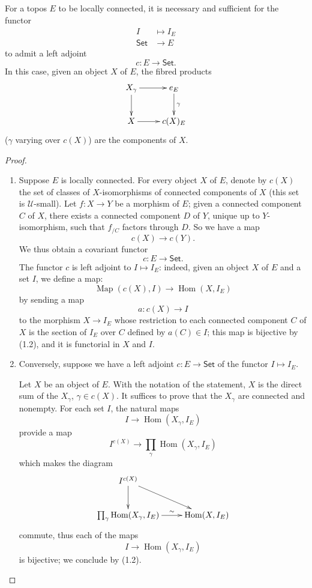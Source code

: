 \documentclass[10pt,oneside]{amsart}
\newcommand{\oldpage}[1]{\marginnote{\textbf{#1}}}
\newcommand{\cal}{\mathcal}
\newcommand{\cat}{\mathsf}
\DeclareMathOperator{\Hom}{Hom}
\DeclareMathOperator{\Map}{Map}
\begin{document}
\subsection{}
For a topos $E$ to be locally connected, it is necessary and sufficient for the functor
\begin{align*}
  I & \longmapsto I_E\\
  \cat{Set} & \longrightarrow E
\end{align*}
to admit a left adjoint
\[
  c:E\longrightarrow\cat{Set}.
\]
In this case, given an object $X$ of $E$, the fibred products
\[
  \xymatrix{
    X_\gamma\ar[r]\ar[d] & e_E\ar[d]^\gamma\\
    X\ar[r] & c(X)_E
  }
\]
($\gamma$ varying over $c(X)$) are the components of $X$.

\begin{proof}
\medskip\noindent
\begin{enumerate}[label=(\roman*)]
  \item Suppose $E$ is locally connected.
    For every object $X$ of $E$, denote by $c(X)$ the set of classes of $X$-isomorphisms of connected components of $X$ (this set is $\cal{U}$-small).
    Let $f:X\to Y$ be a morphism of $E$;
    given a connected component $C$ of $X$, there exists a connected component $D$ of $Y$, unique up to $Y$-isomorphism, such that $f_{/C}$ factors through $D$.
    So we have a map
    \[
      c(X)\longrightarrow c(Y).
    \]
    \oldpage{4}
    We thus obtain a covariant functor
    \[
      c:E\longrightarrow\cat{Set}.
    \]
    The functor $c$ is left adjoint to $I\mapsto I_E$: indeed, given an object $X$ of $E$ and a set $I$, we define a map:
    \[
      \Map(c(X),I)\longrightarrow\Hom(X,I_E)
    \]
    by sending a map
    \[
      a:c(X)\longrightarrow I
    \]
    to the morphism $X\to I_E$ whose restriction to each connected component $C$ of $X$ is the section of $I_E$ over $C$ defined by $a(C)\in I$;
    this map is bijective by (1.2), and it is functorial in $X$ and $I$.
  \item Conversely, suppose we have a left adjoint $c:E\to\cat{Set}$ of the functor $I\mapsto I_E$.

    Let $X$ be an object of $E$.
    With the notation of the statement, $X$ is the direct sum of the $X_\gamma$, $\gamma\in c(X)$.
    It suffices to prove that the $X_\gamma$ are connected and nonempty.
    For each set $I$, the natural maps
    \[
      I\longrightarrow\Hom(X_\gamma,I_E)
    \]
    provide a map
    \[
      I^{c(X)}\longrightarrow\prod_\gamma\Hom(X_\gamma,I_E)
    \]
    which makes the diagram
    \[
      \xymatrix{
        I^{c(X)}\ar[rd]\ar[d]\\
        \prod_\gamma\Hom(X_\gamma,I_E)\ar[r]^-\sim & \Hom(X,I_E)
      }
    \]
    commute, thus each of the maps
    \[ 
      I\longrightarrow\Hom(X_\gamma,I_E)
    \]
    is bijective;
    we conclude by (1.2).
\end{enumerate}
\end{proof}
\end{document}
